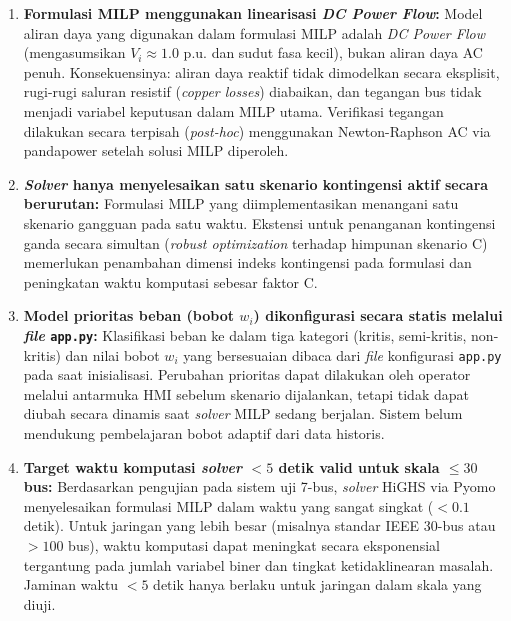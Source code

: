\begin{enumerate}
    \item[a.] \textbf{Formulasi MILP menggunakan linearisasi \textit{DC Power Flow}:} Model aliran daya yang digunakan dalam formulasi MILP adalah \textit{DC Power Flow} (mengasumsikan $V_{i}\approx 1.0$ p.u. dan sudut fasa kecil), bukan aliran daya AC penuh. Konsekuensinya: aliran daya reaktif tidak dimodelkan secara eksplisit, rugi-rugi saluran resistif (\textit{copper losses}) diabaikan, dan tegangan bus tidak menjadi variabel keputusan dalam MILP utama. Verifikasi tegangan dilakukan secara terpisah (\textit{post-hoc}) menggunakan Newton-Raphson AC via pandapower setelah solusi MILP diperoleh.
    
    \item[b.] \textbf{\textit{Solver} hanya menyelesaikan satu skenario kontingensi aktif secara berurutan:} Formulasi MILP yang diimplementasikan menangani satu skenario gangguan pada satu waktu. Ekstensi untuk penanganan kontingensi ganda secara simultan (\textit{robust optimization} terhadap himpunan skenario C) memerlukan penambahan dimensi indeks kontingensi pada formulasi dan peningkatan waktu komputasi sebesar faktor C.
    
    \item[c.] \textbf{Model prioritas beban (bobot $w_{i}$) dikonfigurasi secara statis melalui \textit{file} \texttt{app.py}:} Klasifikasi beban ke dalam tiga kategori (kritis, semi-kritis, non-kritis) dan nilai bobot $w_{i}$ yang bersesuaian dibaca dari \textit{file} konfigurasi \texttt{app.py} pada saat inisialisasi. Perubahan prioritas dapat dilakukan oleh operator melalui antarmuka HMI sebelum skenario dijalankan, tetapi tidak dapat diubah secara dinamis saat \textit{solver} MILP sedang berjalan. Sistem belum mendukung pembelajaran bobot adaptif dari data historis.
    
    \item[d.] \textbf{Target waktu komputasi \textit{solver} $< 5$ detik valid untuk skala $\le 30$ bus:} Berdasarkan pengujian pada sistem uji 7-bus, \textit{solver} HiGHS via Pyomo menyelesaikan formulasi MILP dalam waktu yang sangat singkat ($< 0.1$ detik). Untuk jaringan yang lebih besar (misalnya standar IEEE 30-bus atau $> 100$ bus), waktu komputasi dapat meningkat secara eksponensial tergantung pada jumlah variabel biner dan tingkat ketidaklinearan masalah. Jaminan waktu $< 5$ detik hanya berlaku untuk jaringan dalam skala yang diuji.
\end{enumerate}

